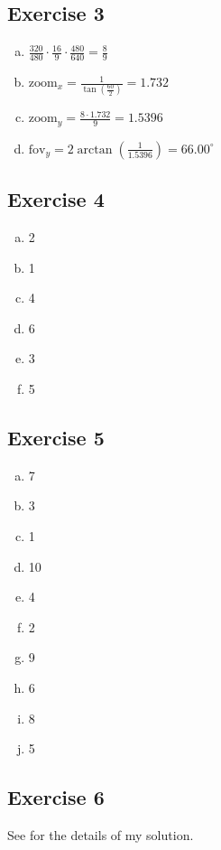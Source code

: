 \documentclass[11pt]{article}
\begin{document}
\subsection{Exercise 3}

\begin{enumerate}[a.]
	\item $\frac{320}{480} \cdot \frac{16}{9} \cdot \frac{480}{640} = \frac{8}{9}$
	\item $\text{zoom}_x = \frac{1}{\tan(\frac{60}{2})} = 1.732$
	\item $\text{zoom}_y = \frac{8 \cdot 1.732}{9} = 1.5396$
	\item $\text{fov}_y = 2 \arctan(\frac{1}{1.5396}) = 66.00^{\circ}$
\end{enumerate}

\subsection{Exercise 4}

\begin{enumerate}[a.]
	\item 2
	\item 1
	\item 4
	\item 6
	\item 3
	\item 5
\end{enumerate}

\subsection{Exercise 5}

\begin{enumerate}[a.]
	\item 7
	\item 3
	\item 1
	\item 10
	\item 4
	\item 2
	\item 9
	\item 6
	\item 8
	\item 5
\end{enumerate}

\subsection{Exercise 6}

See  for the details of my solution.
\end{document}
